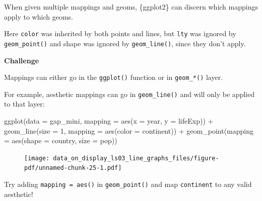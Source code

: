 \documentclass[
  letterpaper,
  DIV=11,
  numbers=noendperiod]{scrreprt}
\newenvironment{Shaded}{\begin{snugshade}}{\end{snugshade}}
\newcommand{\AttributeTok}[1]{\textcolor[rgb]{0.40,0.45,0.13}{#1}}
\newcommand{\DecValTok}[1]{\textcolor[rgb]{0.68,0.00,0.00}{#1}}
\newcommand{\FunctionTok}[1]{\textcolor[rgb]{0.28,0.35,0.67}{#1}}
\newcommand{\NormalTok}[1]{\textcolor[rgb]{0.00,0.23,0.31}{#1}}
\newcommand{\SpecialCharTok}[1]{\textcolor[rgb]{0.37,0.37,0.37}{#1}}
\begin{document}
When given multiple mappings and geoms, \{ggplot2\} can discern which
mappings apply to which geoms.

Here \texttt{color} was inherited by both points and lines, but
\texttt{lty} was ignored by \texttt{geom\_point()} and shape was ignored
by \texttt{geom\_line()}, since they don't apply.

\begin{tcolorbox}[enhanced jigsaw, colframe=quarto-callout-note-color-frame, colbacktitle=quarto-callout-note-color!10!white, titlerule=0mm, opacitybacktitle=0.6, breakable, toprule=.15mm, arc=.35mm, rightrule=.15mm, colback=white, bottomrule=.15mm, opacityback=0, toptitle=1mm, left=2mm, bottomtitle=1mm, title=\textcolor{quarto-callout-note-color}{\faInfo}\hspace{0.5em}{Challenge}, leftrule=.75mm, coltitle=black]

\textbf{Challenge}

Mappings can either go in the \texttt{ggplot()} function or in
\texttt{geom\_*()} layer.

For example, aesthetic mappings can go in \texttt{geom\_line()} and will
only be applied to that layer:

\begin{Shaded}
\begin{Highlighting}[]
\FunctionTok{ggplot}\NormalTok{(}\AttributeTok{data =}\NormalTok{ gap\_mini, }
       \AttributeTok{mapping =} \FunctionTok{aes}\NormalTok{(}\AttributeTok{x =}\NormalTok{ year,}
                     \AttributeTok{y =}\NormalTok{ lifeExp)) }\SpecialCharTok{+}
  \FunctionTok{geom\_line}\NormalTok{(}\AttributeTok{size =} \DecValTok{1}\NormalTok{, }\AttributeTok{mapping =} \FunctionTok{aes}\NormalTok{(}\AttributeTok{color =}\NormalTok{ continent)) }\SpecialCharTok{+} 
  \FunctionTok{geom\_point}\NormalTok{(}\AttributeTok{mapping =} \FunctionTok{aes}\NormalTok{(}\AttributeTok{shape =}\NormalTok{ country, }
                                     \AttributeTok{size =}\NormalTok{ pop))}
\end{Highlighting}
\end{Shaded}

\begin{figure}[H]

{\centering \texttt{[image: data\_on\_display\_ls03\_line\_graphs\_files/figure-pdf/unnamed-chunk-25-1.pdf]}

}

\end{figure}

Try adding \texttt{mapping\ =\ aes()} in \texttt{geom\_point()} and map
\texttt{continent} to any valid aesthetic!

\end{tcolorbox}
\end{document}
